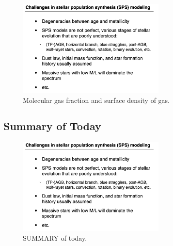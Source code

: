 \documentclass{article}
\begin{document}
\begin{figure}
    \centering
    \includegraphics[width=0.66\textwidth]{figs/Screen Shot 2021-09-24 at 9.35.27 AM.png}
    \caption{Molecular gas fraction and surface density of gas.}
    \label{fig:MORE}
\end{figure}

\subsection{Summary of Today}

\begin{figure}
    \centering
    \includegraphics[width=0.66\textwidth]{figs/Screen Shot 2021-09-24 at 9.35.27 AM.png}
    \caption{SUMMARY of today.}
    \label{fig:summmmm}
\end{figure}
\end{document}
